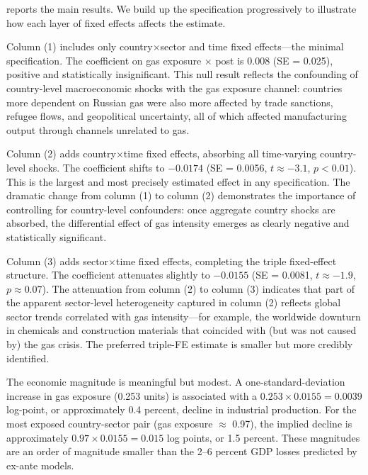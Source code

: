 \documentclass[12pt]{article}
\begin{document}
 reports the main results. We build up the specification progressively to illustrate how each layer of fixed effects affects the estimate.

Column (1) includes only country$\times$sector and time fixed effects---the minimal specification. The coefficient on gas exposure $\times$ post is 0.008 (SE = 0.025), positive and statistically insignificant. This null result reflects the confounding of country-level macroeconomic shocks with the gas exposure channel: countries more dependent on Russian gas were also more affected by trade sanctions, refugee flows, and geopolitical uncertainty, all of which affected manufacturing output through channels unrelated to gas.

Column (2) adds country$\times$time fixed effects, absorbing all time-varying country-level shocks. The coefficient shifts to $-0.0174$ (SE = 0.0056, $t \approx -3.1$, $p < 0.01$). This is the largest and most precisely estimated effect in any specification. The dramatic change from column (1) to column (2) demonstrates the importance of controlling for country-level confounders: once aggregate country shocks are absorbed, the differential effect of gas intensity emerges as clearly negative and statistically significant.

Column (3) adds sector$\times$time fixed effects, completing the triple fixed-effect structure. The coefficient attenuates slightly to $-0.0155$ (SE = 0.0081, $t \approx -1.9$, $p \approx 0.07$). The attenuation from column (2) to column (3) indicates that part of the apparent sector-level heterogeneity captured in column (2) reflects global sector trends correlated with gas intensity---for example, the worldwide downturn in chemicals and construction materials that coincided with (but was not caused by) the gas crisis. The preferred triple-FE estimate is smaller but more credibly identified.



The economic magnitude is meaningful but modest. A one-standard-deviation increase in gas exposure (0.253 units) is associated with a $0.253 \times 0.0155 = 0.0039$ log-point, or approximately 0.4 percent, decline in industrial production. For the most exposed country-sector pair (gas exposure $\approx$ 0.97), the implied decline is approximately $0.97 \times 0.0155 = 0.015$ log points, or 1.5 percent. These magnitudes are an order of magnitude smaller than the 2--6 percent GDP losses predicted by ex-ante models.
\end{document}
